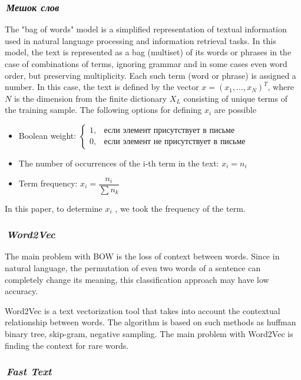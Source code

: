 \documentclass[12pt]{article}
\begin{document}
\subsubsection*{\it\,Мешок слов}
The "bag of words" model is a simplified representation of textual information used in natural language processing and information retrieval tasks. In this model, the text is represented as a bag (multiset) of its words or phrases in the case of combinations of terms, ignoring grammar and in some cases even word order, but preserving multiplicity. Each such term (word or phrase) is assigned a number. In this case, the text is defined by the vector $x=(x_1,..., x_N)^T$, where $N$ is the dimension from the finite dictionary $X_L$ consisting of unique terms of the training sample. The following options for defining $x_i$ are possible
\begin{itemize}
\item Boolean weight: $\begin{cases} 1, & \mbox{если элемент присутствует в письме} \\ 0, & \mbox{если элемент не присутствует в письме}  \end{cases}$
\item The number of occurrences of the i-th term in the text: $x_i = n_i$
\item Term frequency: $x_i = \dfrac{n_i}{\sum n_k}$
\end{itemize}

In this paper, to determine $x_i$ , we took the frequency of the term.

\subsubsection*{\it\,Word2Vec}

The main problem with BOW is the loss of context between words. Since in natural language, the permutation of even two words of a sentence can completely change its meaning, this classification approach may have low accuracy.

Word2Vec is a text vectorization tool that takes into account the contextual relationship between words. The algorithm is based on such methods as huffman binary tree, skip-gram, negative sampling. The main problem with Word2Vec is finding the context for rare words.

\subsubsection*{\it\,Fast Text}
\end{document}
